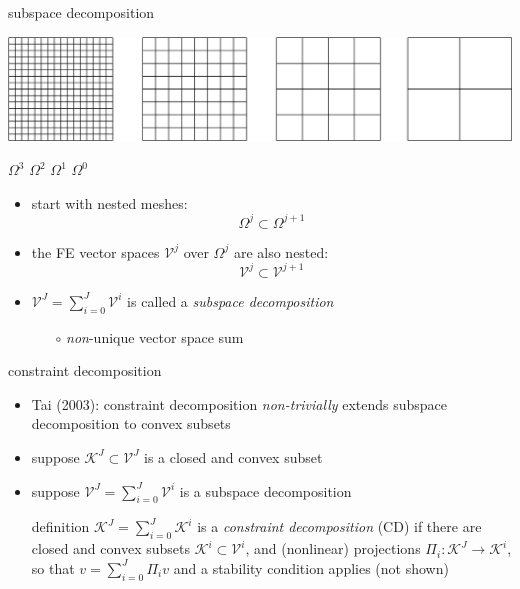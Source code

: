 \documentclass[svgnames,
               hyperref={colorlinks,citecolor=DeepPink4,linkcolor=FireBrick,urlcolor=Maroon},
               usepdftitle=false]  %
               {beamer}
\newcommand{\ds}{\displaystyle}
\begin{document}
\begin{frame}{subspace decomposition}

\hfill \includegraphics[height=0.12\textheight]{../talk-oxford/images/mg-grids.png}

{\footnotesize
\hfill $\Omega^3$ \hspace{8.5mm} $\Omega^2$ \hspace{8.5mm} $\Omega^1$ \hspace{8.5mm} $\Omega^0$ \hspace{1mm}
}

\begin{itemize}
\item start with nested meshes:
    $$\Omega^j \subset \Omega^{j+1}$$
\item the FE vector spaces $\mathcal{V}^j$ over $\Omega^j$ are also nested:
    $$\mathcal{V}^j \subset \mathcal{V}^{j+1}$$
\item $\mathcal{V}^J = \sum_{i=0}^J \mathcal{V}^i$ is called a \emph{subspace decomposition}

    \begin{itemize}
    \item[$\circ$] \emph{non}-unique vector space sum
    \end{itemize}
\end{itemize}
\end{frame}


\begin{frame}{constraint decomposition}

\begin{itemize}
\item Tai (2003): constraint decomposition \emph{non-trivially} extends subspace decomposition to convex subsets
\item suppose $\mathcal{K}^J \subset \mathcal{V}^J$ is a closed and convex subset
\item suppose $\mathcal{V}^J = \sum_{i=0}^J \mathcal{V}^i$ is a subspace decomposition
\begin{block}{definition}
$\ds \mathcal{K}^J = \sum_{i=0}^J \mathcal{K}^i$ \quad is a \emph{constraint decomposition} (CD) if there are closed and convex subsets $\mathcal{K}^i\subset \mathcal{V}^i$, and (nonlinear) projections $\Pi_i : \mathcal{K}^J \to \mathcal{K}^i$, so that $\ds v = \sum_{i=0}^J \Pi_i v$ and a stability condition applies (not shown)
\end{block}
\end{itemize}
\end{frame}
\end{document}
